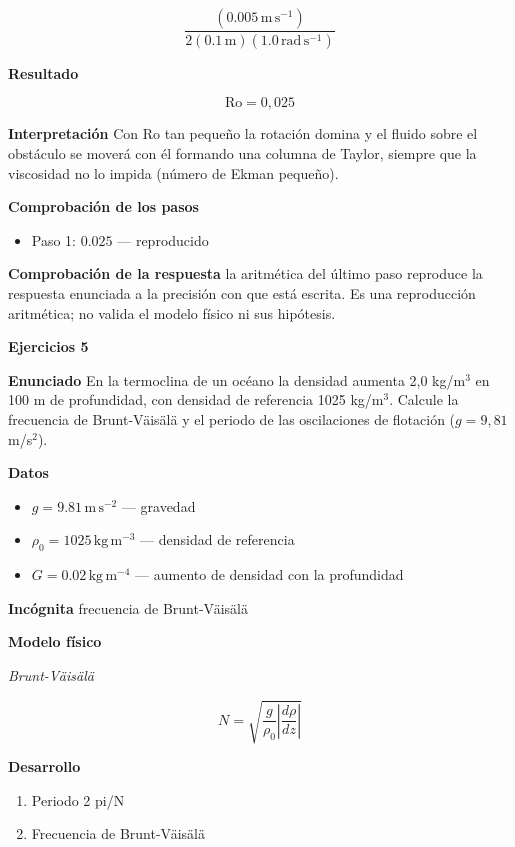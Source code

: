 \documentclass[10pt,openany]{book}
\begin{document}
\[
\frac{\left(0.005\,\mathrm{m}\,\mathrm{s}^{-1}\right)}{2 \left(0.1\,\mathrm{m}\right) \left(1.0\,\mathrm{rad}\,\mathrm{s}^{-1}\right)}
\]

\noindent\textbf{Resultado}

\[
\mathrm{Ro} = 0{,}025
\]

\noindent\textbf{Interpretación}
Con Ro tan pequeño la rotación domina y el fluido sobre el obstáculo se moverá con él formando una columna de Taylor, siempre que la viscosidad no lo impida (número de Ekman pequeño).

\noindent\textbf{Comprobación de los pasos}
\begin{itemize}
\item Paso 1: $0.025$ — reproducido
\end{itemize}

\noindent\textbf{Comprobación de la respuesta} la aritmética del último paso reproduce la respuesta enunciada a la precisión con que está escrita. Es una reproducción aritmética; no valida el modelo físico ni sus hipótesis.

\noindent\textbf{Ejercicios 5}

\noindent\textbf{Enunciado}
En la termoclina de un océano la densidad aumenta 2,0 kg/m\(^3\) en 100 m de profundidad, con densidad de referencia 1025 kg/m\(^3\). Calcule la frecuencia de Brunt-Väisälä y el periodo de las oscilaciones de flotación (\(g = 9{,}81\) m/s\(^2\)).

\noindent\textbf{Datos}
\begin{itemize}
\item $g = 9.81\,\mathrm{m}\,\mathrm{s}^{-2}$ — gravedad
\item $\rho_{0} = 1025\,\mathrm{kg}\,\mathrm{m}^{-3}$ — densidad de referencia
\item $G = 0.02\,\mathrm{kg}\,\mathrm{m}^{-4}$ — aumento de densidad con la profundidad
\end{itemize}

\noindent\textbf{Incógnita}
frecuencia de Brunt-Väisälä

\noindent\textbf{Modelo físico}

\noindent\textit{Brunt-Väisälä}

\[
N = \sqrt{\frac{g}{\rho_0}\left|\frac{d\rho}{dz}\right|}
\]

\noindent\textbf{Desarrollo}
\begin{enumerate}
\item
Periodo 2 pi/N
\item
Frecuencia de Brunt-Väisälä
\end{enumerate}
\end{document}
